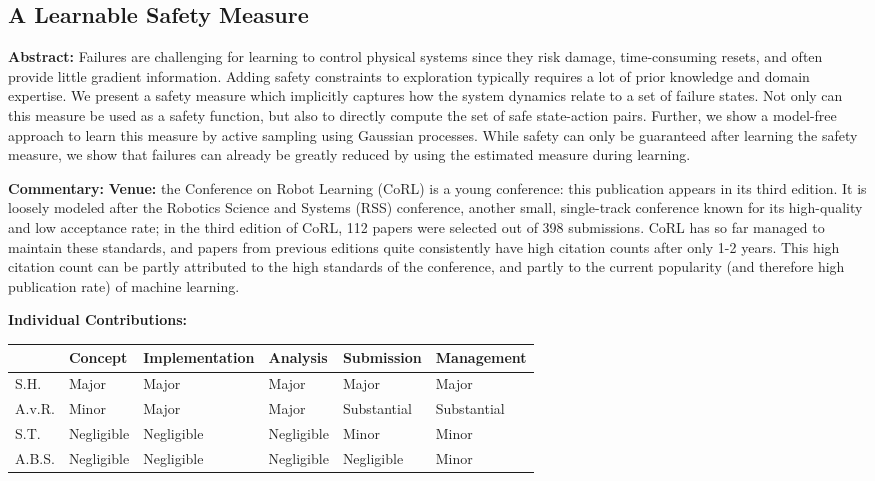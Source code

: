 \subsection{A Learnable Safety Measure}
\textbf{Abstract: }
Failures are challenging for learning to control physical systems since they risk damage, time-consuming resets, and often provide little gradient information. Adding safety constraints to exploration typically requires a lot of prior knowledge and domain expertise. We present a safety measure which implicitly captures how the system dynamics relate to a set of failure states. Not only can this measure be used as a safety function, but also to directly compute the set of safe state-action pairs. Further, we show a model-free approach to learn this measure by active sampling using Gaussian processes. While safety can only be guaranteed after learning the safety measure, we show that failures can already be greatly reduced by using the estimated measure during learning. \par
\textbf{Commentary: }
\textbf{Venue: }
the Conference on Robot Learning (CoRL) is a young conference: this publication appears in its third edition. It is loosely modeled after the Robotics Science and Systems (RSS) conference, another small, single-track conference known for its high-quality and low acceptance rate; in the third edition of CoRL, 112 papers were selected out of 398 submissions. CoRL has so far managed to maintain these standards, and papers from previous editions quite consistently have high citation counts after only 1-2 years. This high citation count can be partly attributed to the high standards of the conference, and partly to the current popularity (and therefore high publication rate) of machine learning. \par
\textbf{Individual Contributions: }
\begin{table}[H]
\begin{tabular}{l|l|l|l|l|l|}
\cline{2-6}
\textbf{} & \textbf{Concept} & {\footnotesize \textbf{Implementation}} & \textbf{Analysis} & \textbf{Submission} & {\footnotesize \textbf{Management}} \\ \hline
\multicolumn{1}{|l|}{S.H.} & Major & Major & Major & Major & Major \\ \hline
\multicolumn{1}{|l|}{A.v.R.} & Minor & Major & Major & Substantial & Substantial \\ \hline
\multicolumn{1}{|l|}{S.T.} & Negligible & Negligible & Negligible & Minor & Minor \\ \hline
\multicolumn{1}{|l|}{A.B.S.} & Negligible & Negligible & Negligible & Negligible & Minor \\ \hline
\end{tabular}
\end{table}


